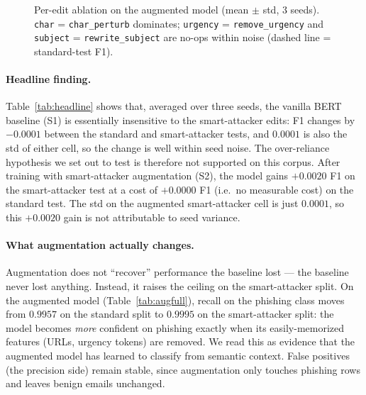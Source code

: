 \documentclass[conference]{IEEEtran}
\begin{document}
\begin{figure}[t]
\centering
{}
\caption{Per-edit ablation on the augmented model (mean $\pm$ std, 3 seeds).
\texttt{char} = \texttt{char\_perturb} dominates; \texttt{urgency} =
\texttt{remove\_urgency} and \texttt{subject} = \texttt{rewrite\_subject}
are no-ops within noise (dashed line = standard-test F1).}
\label{fig:ablation}
\end{figure}

\paragraph{Headline finding.} Table~\ref{tab:headline} shows that, averaged
over three seeds, the vanilla BERT baseline (S1) is essentially insensitive
to the smart-attacker edits: F1 changes by $-0.0001$ between the standard
and smart-attacker tests, and $0.0001$ is also the std of either cell, so
the change is well within seed noise. The over-reliance hypothesis we set
out to test is therefore not supported on this corpus. After training with
smart-attacker augmentation (S2), the model gains $+0.0020$ F1 on the
smart-attacker test at a cost of $+0.0000$ F1 (i.e.~no measurable cost) on
the standard test. The std on the augmented smart-attacker cell is just
$0.0001$, so this $+0.0020$ gain is not attributable to seed variance.

\paragraph{What augmentation actually changes.} Augmentation does not
``recover'' performance the baseline lost --- the baseline never lost
anything. Instead, it raises the ceiling on the smart-attacker split. On
the augmented model (Table~\ref{tab:augfull}), recall on the phishing class
moves from $0.9957$ on the standard split to $0.9995$ on the smart-attacker
split: the model becomes \emph{more} confident on phishing exactly when its
easily-memorized features (URLs, urgency tokens) are removed. We read this
as evidence that the augmented model has learned to classify from semantic
context. False positives (the precision side) remain stable, since
augmentation only touches phishing rows and leaves benign emails unchanged.
\end{document}
